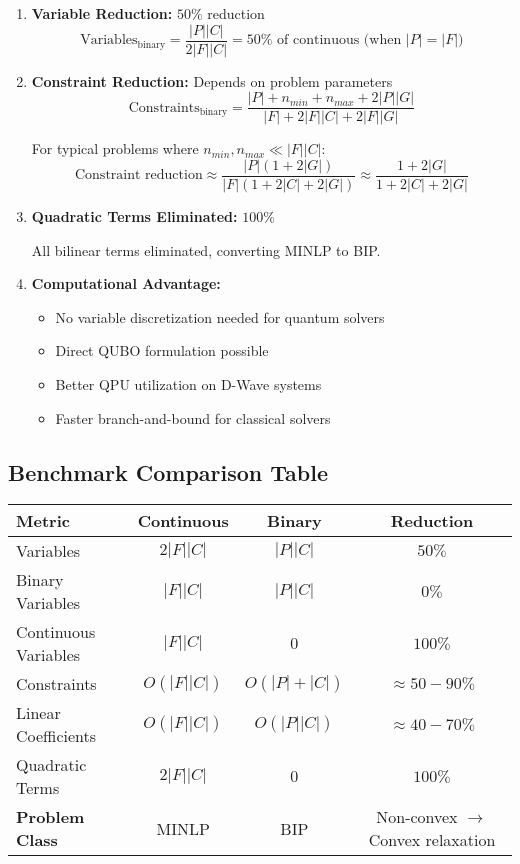 \documentclass{article}
\begin{document}
\begin{enumerate}
    \item \textbf{Variable Reduction:} $50\%$ reduction
    $$\text{Variables}_{\text{binary}} = \frac{|P||C|}{2|F||C|} = 50\% \text{ of continuous (when } |P| = |F|)$$
    
    \item \textbf{Constraint Reduction:} Depends on problem parameters
    $$\text{Constraints}_{\text{binary}} = \frac{|P| + n_{min} + n_{max} + 2|P||G|}{|F| + 2|F||C| + 2|F||G|}$$
    
    For typical problems where $n_{min}, n_{max} \ll |F||C|$:
    $$\text{Constraint reduction} \approx \frac{|P|(1 + 2|G|)}{|F|(1 + 2|C| + 2|G|)} \approx \frac{1 + 2|G|}{1 + 2|C| + 2|G|}$$
    
    \item \textbf{Quadratic Terms Eliminated:} $100\%$
    
    All bilinear terms eliminated, converting MINLP to BIP.
    
    \item \textbf{Computational Advantage:}
    \begin{itemize}
        \item No variable discretization needed for quantum solvers
        \item Direct QUBO formulation possible
        \item Better QPU utilization on D-Wave systems
        \item Faster branch-and-bound for classical solvers
    \end{itemize}
\end{enumerate}

\subsection{Benchmark Comparison Table}

\begin{center}
\begin{tabular}{|l|c|c|c|}
\hline
\textbf{Metric} & \textbf{Continuous} & \textbf{Binary} & \textbf{Reduction} \\
\hline
Variables & $2|F||C|$ & $|P||C|$ & $50\%$ \\
Binary Variables & $|F||C|$ & $|P||C|$ & $0\%$ \\
Continuous Variables & $|F||C|$ & $0$ & $100\%$ \\
Constraints & $O(|F||C|)$ & $O(|P| + |C|)$ & $\approx 50-90\%$ \\
Linear Coefficients & $O(|F||C|)$ & $O(|P||C|)$ & $\approx 40-70\%$ \\
Quadratic Terms & $2|F||C|$ & $0$ & $100\%$ \\
\hline
\textbf{Problem Class} & MINLP & BIP & Non-convex $\to$ Convex relaxation \\
\hline
\end{tabular}
\end{center}
\end{document}
